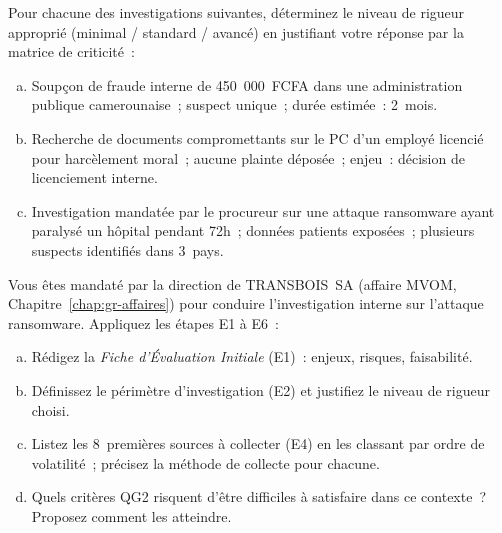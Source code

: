 \begin{boxexo}[title={\ding{45}\quad Exercice~6.1 --- Matrice de criticité \niveaubase}]
Pour chacune des investigations suivantes, déterminez le niveau de rigueur
approprié (minimal / standard / avancé) en justifiant votre réponse par
la matrice de criticité~:
\begin{enumerate}[(a)]
    \item Soupçon de fraude interne de 450~000~FCFA dans une administration
          publique camerounaise~; suspect unique~; durée estimée~: 2~mois.
    \item Recherche de documents compromettants sur le PC d'un employé
          licencié pour harcèlement moral~; aucune plainte déposée~;
          enjeu~: décision de licenciement interne.
    \item Investigation mandatée par le procureur sur une attaque ransomware
          ayant paralysé un hôpital pendant 72h~; données patients exposées~;
          plusieurs suspects identifiés dans 3~pays.
\end{enumerate}
\end{boxexo}

\begin{boxexo}[title={\ding{45}\quad Exercice~6.2 --- Application du PIU \niveaumoyen}]
Vous êtes mandaté par la direction de TRANSBOIS~SA (affaire MVOM,
Chapitre~\ref{chap:gr-affaires}) pour conduire l'investigation interne
sur l'attaque ransomware. Appliquez les étapes E1 à E6~:
\begin{enumerate}[(a)]
    \item Rédigez la \textit{Fiche d'Évaluation Initiale} (E1)~: enjeux,
          risques, faisabilité.
    \item Définissez le périmètre d'investigation (E2) et justifiez le niveau
          de rigueur choisi.
    \item Listez les 8~premières sources à collecter (E4) en les classant
          par ordre de volatilité~; précisez la méthode de collecte pour
          chacune.
    \item Quels critères QG2 risquent d'être difficiles à satisfaire dans
          ce contexte~? Proposez comment les atteindre.
\end{enumerate}
\end{boxexo}

